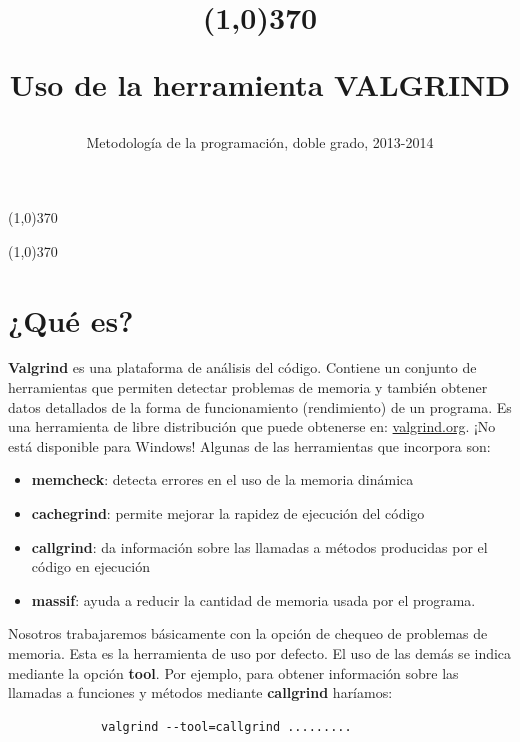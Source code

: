 \documentclass[11pt,a4paper,professionalfonts]{article}
\author{Metodología de la programación, doble grado, 2013-2014}
\title{\vspace{-3cm}\begin{center} \line(1,0){370} \\\vspace{0.5cm} \end{center}
Uso de la herramienta VALGRIND}
\date{}
\begin{document}
\renewcommand{\contentsname}{Contenido:}

\maketitle
\vspace{-1.5cm}
\begin{center} \line(1,0){370} \end{center}
\vspace{0.5cm}

\tableofcontents
\vspace{-0.3cm}
\begin{center} \line(1,0){370} \end{center}
\vspace{0.5cm}

\section{¿Qué es?}

\textbf{Valgrind} es una plataforma de análisis del código. Contiene un conjunto
de herramientas que permiten detectar problemas de memoria y también obtener
datos detallados de la forma de funcionamiento (rendimiento) de un programa.
Es una herramienta de libre distribución que puede obtenerse en: 
\url{valgrind.org}. ¡No está disponible para Windows! Algunas de las herramientas 
que incorpora son:

\begin{itemize}
\item \textbf{memcheck}: detecta errores en el uso de la memoria dinámica
\item \textbf{cachegrind}: permite mejorar la rapidez de ejecución del código
\item \textbf{callgrind}: da información sobre las llamadas a métodos producidas
por el código en ejecución
\item \textbf{massif}: ayuda a reducir la cantidad de memoria usada por el programa.
\end{itemize}


Nosotros trabajaremos básicamente con la opción de chequeo de problemas de memoria. Esta
es la herra\-mienta de uso por defecto. El uso de las demás se indica mediante la opción
\textbf{tool}. Por ejemplo, para obtener información sobre las llamadas a 
funciones y métodos mediante \textbf{callgrind} haríamos:


\begin{verbatim}
             valgrind --tool=callgrind .........
\end{verbatim}
\end{document}
